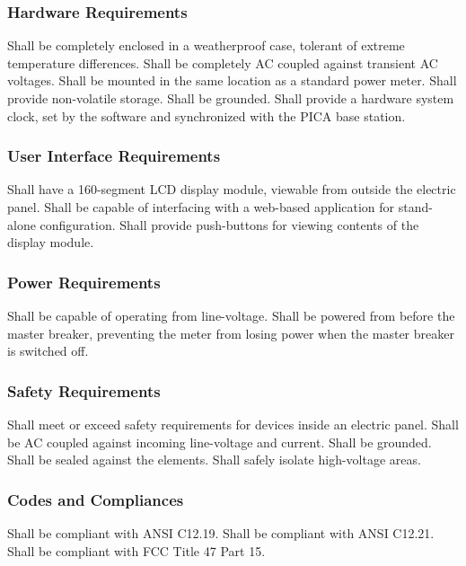 \subsubsection{Hardware Requirements}
\begin{outline}[enumerate]
\1 Shall be completely enclosed in a weatherproof case, tolerant of extreme temperature differences.
\1 Shall be completely AC coupled against transient AC voltages.
\1 Shall be mounted in the same location as a standard power meter.
\1 Shall provide non-volatile storage.
\1 Shall be grounded.
\1 Shall provide a hardware system clock, set by the software and synchronized with the PICA base station.
\end{outline}

\subsubsection{User Interface Requirements}
\begin{outline}[enumerate]
\1 Shall have a 160-segment LCD display module, viewable from outside the electric panel.
\1 Shall be capable of interfacing with a web-based application for stand-alone configuration.
\1 Shall provide push-buttons for viewing contents of the display module.
\end{outline}

\subsubsection{Power Requirements}
\begin{outline}[enumerate]
\1 Shall be capable of operating from line-voltage.
\1 Shall be powered from before the master breaker, preventing the meter from losing power when the master breaker is switched off.
\end{outline}

\subsubsection{Safety Requirements}
\begin{outline}[enumerate]
\1 Shall meet or exceed safety requirements for devices inside an electric panel.
\1 Shall be AC coupled against incoming line-voltage and current.
\1 Shall be grounded.
\1 Shall be sealed against the elements.
\1 Shall safely isolate high-voltage areas.
\end{outline}

\subsubsection{Codes and Compliances}
\begin{outline}[enumerate]
\1 Shall be compliant with ANSI C12.19.
\1 Shall be compliant with ANSI C12.21.
\1 Shall be compliant with FCC Title 47 Part 15.
\end{outline}


